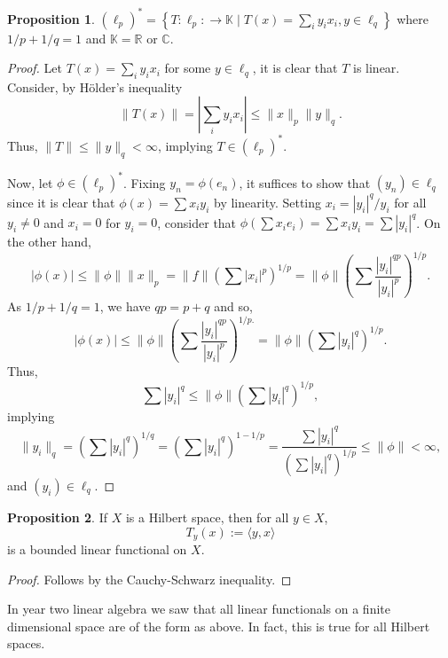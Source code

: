 \documentclass[]{article}
\theoremstyle{definition}
\theoremstyle{definition}
\newtheorem{proposition}{Proposition}[section]
\begin{document}
\begin{proposition}
  \((\ell_p)^* = \left\{T : \ell_p : \to \mathbb{K} \mid T(x) = 
    \sum_i y_i x_i, y \in \ell_q\right\}\) where \(1 / p + 1 / q = 1\) and 
    \(\mathbb{K} = \mathbb{R}\) or \(\mathbb{C}\).
\end{proposition}
\begin{proof}
  Let \(T(x) = \sum_i y_i x_i\) for some \(y \in \ell_q\), it is clear that 
  \(T\) is linear. Consider, by Hölder's inequality
  \[\|T(x)\| = \left|\sum_i y_i x_i\right| \le \|x\|_p \|y\|_q.\]
  Thus, \(\|T\| \le \|y\|_q < \infty\), implying \(T \in (\ell_p)^*\).

  Now, let \(\phi \in (\ell_p)^*\). 
  Fixing \(y_n = \phi(e_n)\), it suffices to show 
  that \((y_n) \in \ell_q\) since it is clear that \(\phi(x) = \sum x_i y_i\) 
  by linearity. 
  Setting \(x_i = |y_i|^q / y_i\) for all \(y_i \neq 0\) and \(x_i = 0\) for 
  \(y_i = 0\), consider that \(\phi(\sum x_i e_i) = \sum x_i y_i = \sum |y_i|^q\). 
  On the other hand, 
  \[|\phi(x)| \le \|\phi\| \|x\|_p = \|f\|\left(\sum |x_i|^p\right)^{1 / p} 
  = \|\phi\| \left(\sum \frac{|y_i|^{qp}}{|y_i|^p}\right)^{1 / p}.\]
  As \(1 / p + 1 / q = 1\), we have \(qp = p + q\) and so, 
  \[|\phi(x)| \le  \|\phi\| \left(\sum \frac{|y_i|^{qp}}{|y_i|^p}\right)^{1 / p.}
  = \|\phi\| \left(\sum |y_i|^q\right)^{1 / p}.\]
  Thus, 
  \[\sum |y_i|^q \le \|\phi\| \left(\sum |y_i|^q\right)^{1 / p},\]
  implying 
  \[\|y_i\|_q = \left(\sum |y_i|^q\right)^{1 / q} = 
  \left(\sum |y_i|^q\right)^{1 - 1 / p} = 
  \frac{\sum |y_i|^q}{\left(\sum |y_i|^q\right)^{1 / p}} 
  \le \|\phi\| < \infty,\]
  and \((y_i) \in \ell_q\).
\end{proof}

\begin{proposition}
  If \(X\) is a Hilbert space, then for all \(y \in X\), 
  \[T_y(x) := \langle y, x \rangle\]
  is a bounded linear functional on \(X\).
\end{proposition}
\begin{proof}
  Follows by the Cauchy-Schwarz inequality.
\end{proof}

In year two linear algebra we saw that all linear functionals on a finite 
dimensional space are of the form as above. In fact, this is true for 
all Hilbert spaces.
\end{document}

